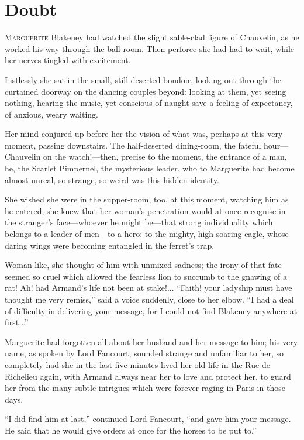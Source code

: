 
\chapter{Doubt}
\lettrine[lines=4]{M}{arguerite} Blakeney had watched the slight sable-clad figure of Chauvelin, as he worked his way through the ball-room. Then perforce she had had to wait, while her nerves tingled with excitement.

Listlessly she sat in the small, still deserted boudoir, looking out through the curtained doorway on the dancing couples beyond: looking at them, yet seeing nothing, hearing the music, yet conscious of naught save a feeling of expectancy, of anxious, weary waiting.

Her mind conjured up before her the vision of what was, perhaps at this very moment, passing downstairs. The half-deserted dining-room, the fateful hour---Chauvelin on the watch!---then, precise to the moment, the entrance of a man, he, the Scarlet Pimpernel, the mysterious leader, who to Marguerite had become almost unreal, so strange, so weird was this hidden identity.

She wished she were in the supper-room, too, at this moment, watching him as he entered; she knew that her woman's penetration would at once recognise in the  stranger's face---whoever he might be---that strong individuality which belongs to a leader of men---to a hero: to the mighty, high-soaring eagle, whose daring wings were becoming entangled in the ferret's trap.

Woman-like, she thought of him with unmixed sadness; the irony of that fate seemed so cruel which allowed the fearless lion to succumb to the gnawing of a rat! Ah! had Armand's life not been at stake!... \enquote{Faith! your ladyship must have thought me very remiss,} said a voice suddenly, close to her elbow. \enquote{I had a deal of difficulty in delivering your message, for I could not find Blakeney anywhere at first...}

Marguerite had forgotten all about her husband and her message to him; his very name, as spoken by Lord Fancourt, sounded strange and unfamiliar to her, so completely had she in the last five minutes lived her old life in the Rue de Richelieu again, with Armand always near her to love and protect her, to guard her from the many subtle intrigues which were forever raging in Paris in those days.

\enquote{I did find him at last,} continued Lord Fancourt, \enquote{and gave him your message. He said that he would give orders at once for the horses to be put to.}


